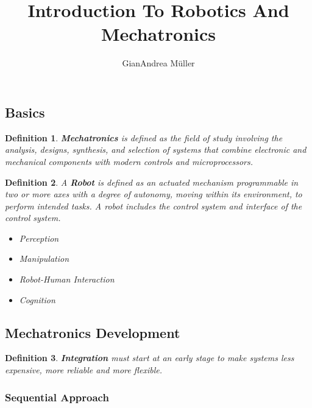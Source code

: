 \documentclass[10pt,a4paper]{scrartcl}
\title{Introduction To Robotics And Mechatronics}
\author{GianAndrea Müller}
\newtheorem{define}{Definition}
\begin{document}
\begin{multicols*}{4}
\maketitle
\tableofcontents
\end{multicols*}

\begin{multicols*}{2}
\section{Basics}

\begin{define}
\textbf{Mechatronics} is defined as the field of study involving the analysis, designs, synthesis, and selection of systems that combine electronic and mechanical components with modern controls and microprocessors.
\end{define}

\begin{define}
A \textbf{Robot} is defined as an actuated mechanism programmable in two or more axes with a degree of autonomy, moving within its environment, to perform intended tasks. A robot includes the control system and interface of the control system.

\begin{itemize}
\item Perception
\item Manipulation
\item Robot-Human Interaction
\item Cognition
\end{itemize}
\end{define}

\subsection{Mechatronics Development}

\begin{define}
\textbf{Integration} must start at an early stage to make  systems less expensive, more reliable and more flexible.
\end{define}

\subsubsection{Sequential Approach}


\end{multicols*}
\end{document}
